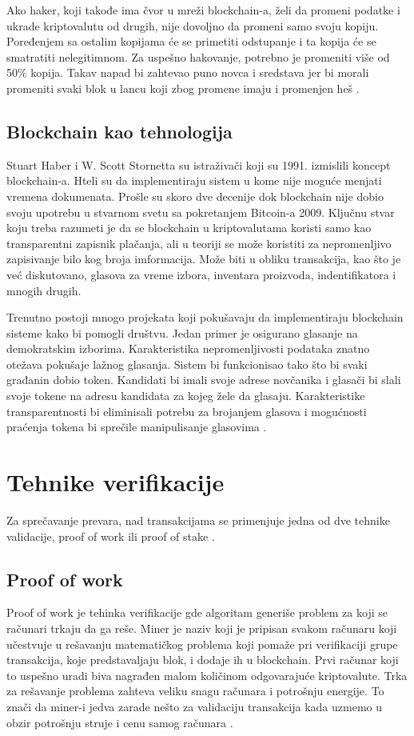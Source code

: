 \documentclass[a4paper]{article}
\begin{document}
{Ako haker, koji takođe ima čvor u mreži blockchain-a, želi da promeni podatke i ukrade kriptovalutu od drugih, nije dovoljno da promeni samo svoju kopiju. Poređenjem sa ostalim kopijama će se primetiti odstupanje i ta kopija će se smatratiti nelegitimnom. Za uspešno hakovanje, potrebno je promeniti više od 50\% kopija. Takav napad bi zahtevao puno novca i sredstava jer bi morali promeniti svaki blok u lancu koji zbog promene imaju i promenjen heš \cite{blockchain}.

\newpage

\subsection{Blockchain kao tehnologija}
\label{subsec:tehnologija}
Stuart Haber i W. Scott Stornetta su istraživači koji su 1991. izmislili koncept blockchain-a. Hteli su da implementiraju sistem u kome nije moguće menjati vremena dokumenata. Prošle su skoro dve decenije dok blockchain nije dobio svoju upotrebu u stvarnom svetu sa pokretanjem Bitcoin-a 2009. Ključnu stvar koju treba razumeti je da se blockchain u kriptovalutama koristi samo kao transparentni zapisnik plačanja, ali u teoriji  se može koristiti za nepromenljivo zapisivanje bilo kog broja imformacija. Može biti u obliku transakcija, kao što je već diskutovano, glasova za vreme izbora, inventara proizvoda, indentifikatora i mnogih drugih.

Trenutno postoji mnogo projekata koji pokušavaju da implementiraju blockchain sisteme kako bi pomogli društvu. Jedan primer je osigurano glasanje na demokratskim izborima. Karakteristika nepromenljivosti podataka znatno otežava pokušaje lažnog glasanja. Sistem bi funkcionisao tako što bi svaki građanin dobio token. Kandidati bi imali svoje adrese novčanika i glasači bi slali svoje tokene na adresu kandidata za kojeg žele da glasaju. Karakteristike transparentnosti bi eliminisali potrebu za brojanjem glasova i mogućnosti praćenja tokena bi sprečile manipulisanje glasovima \cite{blockchain}.


\section{Tehnike verifikacije}
\label{sec:verifikacija}
Za sprečavanje prevara, nad transakcijama se primenjuje jedna od dve tehnike validacije, proof of work ili proof of stake \cite{kriptovalute2}.

\subsection{Proof of work}
\label{subsec:work}
Proof of work je tehinka verifikacije gde algoritam generiše problem za koji se računari trkaju da ga reše.
Miner je naziv koji je pripisan svakom računaru koji učestvuje u rešavanju matematičkog problema koji pomaže pri verifikaciji grupe transakcija, koje predstavaljaju blok, i dodaje ih u blockchain. Prvi računar koji to uspešno uradi biva nagrađen malom količinom odgovarajuće kriptovalute.
Trka za rešavanje problema zahteva veliku snagu računara i potrošnju energije. To znači da miner-i jedva zarade nešto za validaciju transakcija kada uzmemo u obzir potrošnju struje i cenu samog računara \cite{kriptovalute2}.

}
\end{document}
